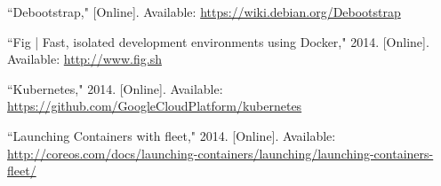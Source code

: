 \documentclass[\myfontsize, letterpaper]{article}
\begin{document}
\begin{thebibliography}{99}
``Debootstrap," [Online]. Available: \href{https://wiki.debian.org/Debootstrap}{https://wiki.debian.org/Debootstrap}

``Fig | Fast, isolated development environments using Docker," 2014. [Online]. Available: \href{http://www.fig.sh}{http://www.fig.sh}

``Kubernetes," 2014. [Online]. Available: \href{https://github.com/GoogleCloudPlatform/kubernetes}{https://github.com/GoogleCloudPlatform/kubernetes}

``Launching Containers with fleet," 2014. [Online]. Available: \href{http://coreos.com/docs/launching-containers/launching/launching-containers-fleet/}{http://coreos.com/docs/launching-containers/launching/launching-containers-fleet/}



\end{thebibliography}
\end{document}
